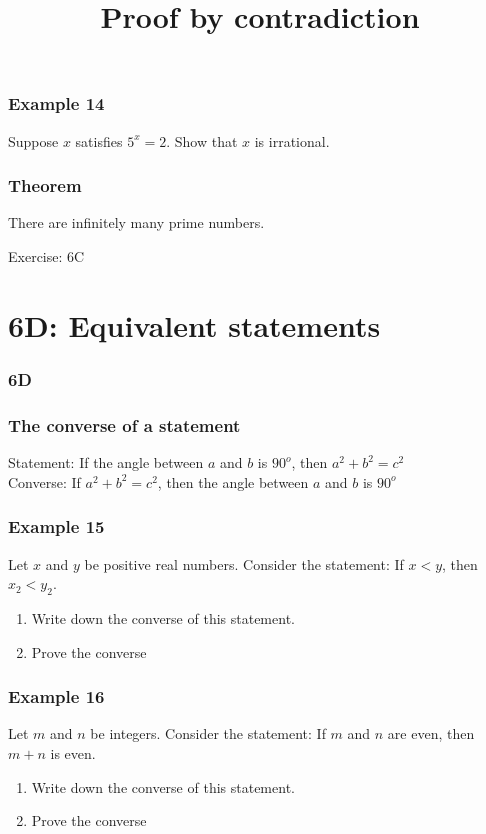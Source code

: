 \documentclass{beamer}
\begin{document}
\begin{frame}[t]
    \frametitle{Example 14}
    Suppose $x$ satisfies $5^x = 2$. Show that $x$ is irrational.
\end{frame}

\begin{frame}[t]
    \frametitle{Theorem}
    There are infinitely many prime numbers.
\end{frame}

\begin{frame}{Exercise: 6C}
\end{frame}

\section{6D: Equivalent statements}
\begin{frame}
    \frametitle{6D}
    \begin{center}
        \title{Proof by contradiction}
        \maketitle
    \end{center}
\end{frame}

\begin{frame}
    \frametitle{The converse of a statement}
    Statement: If the angle between $a$ and $b$ is $90^o$, then $a^2 + b^2 = c^2$\\
    Converse: If $a^2 + b^2 = c^2$, then the angle between $a$ and $b$ is $90^o$
\end{frame}

\begin{frame}[t]
    \frametitle{Example 15}
    Let $x$ and $y$ be positive real numbers. Consider the statement: If $x < y$, then $x_2 < y_2$.\\
    \begin{enumerate}
        \item Write down the converse of this statement.
        \item Prove the converse
    \end{enumerate}
\end{frame}

\begin{frame}[t]
    \frametitle{Example 16}
    Let $m$ and $n$ be integers. Consider the statement: If $m$ and $n$ are even, then $m + n$ is even.\\
    \begin{enumerate}
        \item Write down the converse of this statement.
        \item Prove the converse
    \end{enumerate}
\end{frame}
\end{document}
